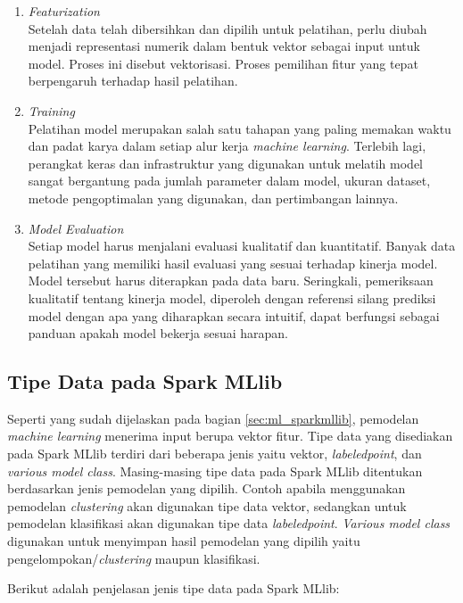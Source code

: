 \begin{enumerate}

\item \textit{Featurization}\\
Setelah data telah dibersihkan dan dipilih untuk pelatihan, perlu diubah menjadi representasi numerik dalam bentuk vektor sebagai input untuk model. Proses ini disebut vektorisasi. Proses pemilihan fitur yang tepat berpengaruh terhadap hasil pelatihan.
 
\item \textit{Training}\\
Pelatihan model merupakan salah satu tahapan yang paling memakan waktu dan padat karya dalam setiap alur kerja \textit{machine learning}. Terlebih lagi, perangkat keras dan infrastruktur yang digunakan untuk melatih model sangat bergantung pada jumlah parameter dalam model, ukuran dataset, metode pengoptimalan yang digunakan, dan pertimbangan lainnya.

\item \textit{Model Evaluation}\\
Setiap model harus menjalani evaluasi kualitatif dan kuantitatif. Banyak data pelatihan yang memiliki hasil evaluasi yang sesuai terhadap kinerja model. Model tersebut harus diterapkan pada data baru. Seringkali, pemeriksaan kualitatif tentang kinerja model, diperoleh dengan referensi silang prediksi model dengan apa yang diharapkan secara intuitif, dapat berfungsi sebagai panduan apakah model bekerja sesuai harapan.
\end{enumerate}

\subsection{Tipe Data pada Spark MLlib}
Seperti yang sudah dijelaskan pada bagian \ref{sec:ml_sparkmllib}, pemodelan \textit{machine learning} menerima input berupa vektor fitur. Tipe data yang disediakan pada Spark MLlib terdiri dari beberapa jenis yaitu vektor, \textit{labeledpoint}, dan \textit{various model class}. Masing-masing tipe data pada Spark MLlib ditentukan berdasarkan jenis pemodelan yang dipilih. Contoh apabila menggunakan pemodelan \textit{clustering} akan digunakan tipe data vektor, sedangkan untuk pemodelan klasifikasi akan digunakan tipe data \textit{labeledpoint}. \textit{Various model class} digunakan untuk menyimpan hasil pemodelan yang dipilih yaitu pengelompokan/\textit{clustering} maupun klasifikasi.

\newpage
\noindent Berikut adalah penjelasan jenis tipe data pada Spark MLlib:

